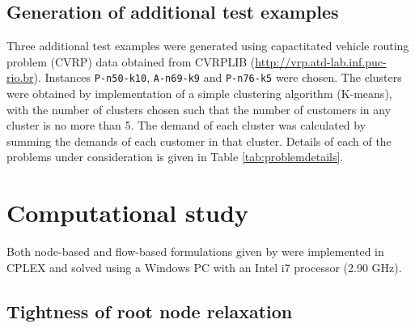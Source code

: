 \documentclass[letterpaper,12pt,onehalfspacing,twoside]{article}
\theoremstyle{msds}
\begin{document}
\subsection{Generation of additional test examples}

Three additional test examples were generated using capactitated vehicle routing problem (CVRP) data obtained from CVRPLIB (\url{http://vrp.atd-lab.inf.puc-rio.br}). Instances \texttt{P-n50-k10}, \texttt{A-n69-k9} and \texttt{P-n76-k5} were chosen. The clusters were obtained by implementation of a simple clustering algorithm (K-means), with the number of clusters chosen such that the number of customers in any cluster is no more than 5. The demand of each cluster was calculated by summing the demands of each customer in that cluster. 
Details of each of the problems under consideration is given in Table \ref{tab:problemdetails}.

\section{Computational study}

Both node-based and flow-based formulations given by \cite{POP201297} were implemented in CPLEX and solved using a Windows PC with an Intel i7 processor (2.90 GHz). 

\subsection{Tightness of root node relaxation}
\end{document}
